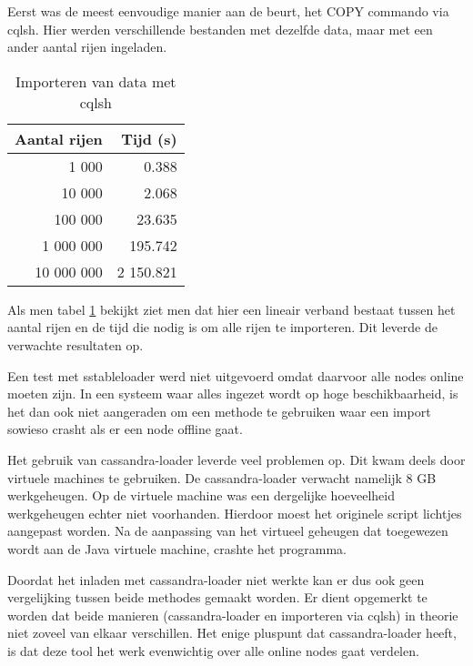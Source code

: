 Eerst was de meest eenvoudige manier aan de beurt, het COPY commando via cqlsh.
Hier werden verschillende bestanden met dezelfde data, maar met een ander aantal rijen ingeladen.

\begin{table}[H]
	\centering
	\begin{tabular}{|r|r|}
		\hline
		Aantal rijen & Tijd (s) \\
		\hline
		\hline
		1 000 & 0.388 \\
		\hline
		10 000 & 2.068 \\
		\hline
		100 000 & 23.635 \\
		\hline
		1 000 000 & 195.742 \\
		\hline
		10 000 000 & 2 150.821\\
		\hline
	\end{tabular}
	\caption{Importeren van data met cqlsh}
	\label{tab:cas_cqlsh}
\end{table}

Als men tabel \ref{tab:cas_cqlsh} bekijkt ziet men dat hier een lineair verband bestaat tussen het aantal rijen en de tijd die nodig is om alle rijen te importeren.
Dit leverde de verwachte resultaten op.

Een test met sstableloader werd niet uitgevoerd omdat daarvoor alle nodes online moeten zijn.
In een systeem waar alles ingezet wordt op hoge beschikbaarheid, is het dan ook niet aangeraden om een methode te gebruiken waar een import sowieso crasht als er een node offline gaat.

Het gebruik van cassandra-loader leverde veel problemen op.
Dit kwam deels door virtuele machines te gebruiken.
De cassandra-loader verwacht namelijk 8 GB werkgeheugen.
Op de virtuele machine was een dergelijke hoeveelheid werkgeheugen echter niet voorhanden.
Hierdoor moest het originele script lichtjes aangepast worden.
Na de aanpassing van het virtueel geheugen dat toegewezen wordt aan de Java virtuele machine, crashte het programma.

Doordat het inladen met cassandra-loader niet werkte kan er dus ook geen vergelijking tussen beide methodes gemaakt worden.
Er dient opgemerkt te worden dat beide manieren (cassandra-loader en importeren via cqlsh) in theorie niet zoveel van elkaar verschillen.
Het enige pluspunt dat cassandra-loader heeft, is dat deze tool het werk evenwichtig over alle online nodes gaat verdelen.